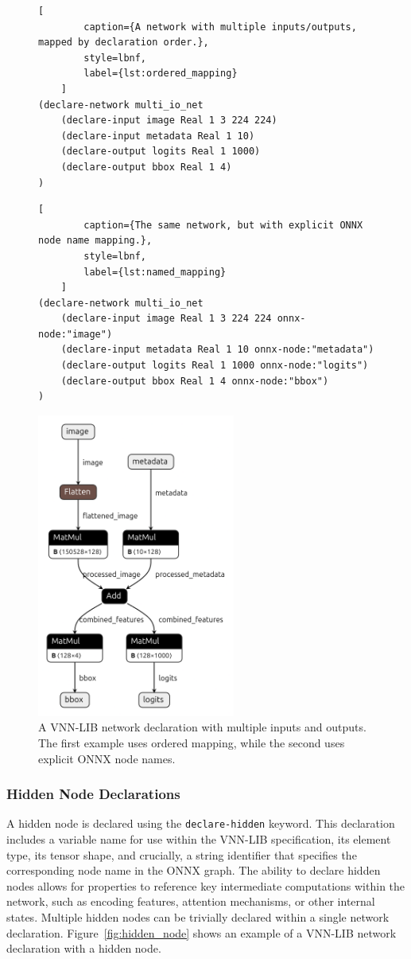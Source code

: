 \begin{figure}[htbp]
    \centering
    \begin{lstlisting}[
        caption={A network with multiple inputs/outputs, mapped by declaration order.},
        style=lbnf,
        label={lst:ordered_mapping}
    ]
(declare-network multi_io_net
    (declare-input image Real 1 3 224 224)
    (declare-input metadata Real 1 10)
    (declare-output logits Real 1 1000)
    (declare-output bbox Real 1 4)
)
    \end{lstlisting}
    \begin{lstlisting}[
        caption={The same network, but with explicit ONNX node name mapping.},
        style=lbnf,
        label={lst:named_mapping}
    ]
(declare-network multi_io_net
    (declare-input image Real 1 3 224 224 onnx-node:"image")
    (declare-input metadata Real 1 10 onnx-node:"metadata")
    (declare-output logits Real 1 1000 onnx-node:"logits")
    (declare-output bbox Real 1 4 onnx-node:"bbox")
)
    \end{lstlisting}
    \vspace{0.5cm}
    \includegraphics[height=10cm]{imgs/multi_io_net.onnx.png}
    \caption{A VNN-LIB network declaration with multiple inputs and outputs. The first example uses ordered mapping, while the second uses explicit ONNX node names.}
    \label{fig:multi_io_net}
\end{figure}

\subsubsection*{Hidden Node Declarations}
\label{sec:hidden-node-declarations}
A hidden node is declared using the \texttt{declare-hidden} keyword. This declaration includes a variable name for use within the VNN-LIB specification, 
its element type, its tensor shape, and crucially, a string identifier that specifies the corresponding node name in the ONNX graph. The ability to declare hidden nodes
allows for properties to reference key intermediate computations within the network, such as encoding features, attention mechanisms, or other internal states. Multiple
hidden nodes can be trivially declared within a single network declaration. Figure~\ref{fig:hidden_node} shows an example of a VNN-LIB network declaration with a hidden node.

